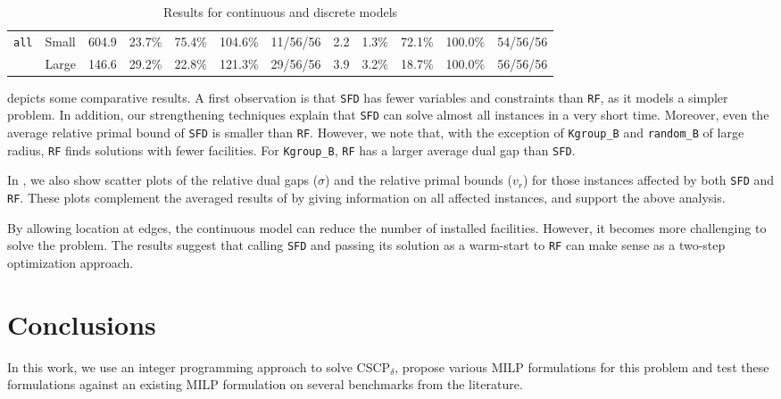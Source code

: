 \documentclass[review]{elsarticle}
\newcommand{\dlt}{{\delta}}
\newcommand{\problem}{CSCP$_\dlt$}
\theoremstyle{definition}
\begin{document}
\begin{table}[htbp]
\begin{center}
\begin{tabular}{|l|l|*{5}{r}|*{5}{r}}
\multirow{2}{*}{\texttt{all}}&Small & 604.9 & 23.7\% & 75.4\% & 104.6\% & 11/56/56 & 2.2 & 1.3\% & 72.1\% & 100.0\% & \multicolumn{1}{l|}{54/56/56} \\
&Large & 146.6 & 29.2\% & 22.8\% & 121.3\% & 29/56/56 & 3.9 & 3.2\% & 18.7\% & 100.0\% & \multicolumn{1}{l|}{56/56/56} \\
\cline{1-12}
\end{tabular}
\end{center}
\caption{Results for continuous and discrete models} \label{tab.cdm}
\end{table}

 depicts some comparative results. A first observation is that \texttt{SFD} has fewer variables and constraints than  \texttt{RF}, as it models a simpler problem. In addition, our strengthening techniques explain that \texttt{SFD} can solve almost all instances in a very short time. Moreover, even the average relative primal bound of \texttt{SFD} is smaller than \texttt{RF}. However, we note that, with the exception of \texttt{Kgroup\_B} and \texttt{random\_B} of large radius, \texttt{RF} finds solutions with fewer facilities.  For \texttt{Kgroup\_B}, \texttt{RF} has a larger average dual gap than \texttt{SFD}.

In , we  also show scatter plots of the relative dual gaps ($\sigma$) and the relative primal bounds ($v_r$) for those instances affected by both \texttt{SFD} and \texttt{RF}. These plots complement the averaged results of  by giving information on all affected instances, and support the above analysis.

By allowing location at edges, the continuous model can reduce the number of installed facilities. However, it becomes more challenging to solve the problem. The results suggest that calling \texttt{SFD} and passing its solution as a warm-start to \texttt{RF} can make sense as a two-step optimization approach.


\section{Conclusions}\label{sec:conclu}
In this work, we use an integer programming approach to solve \problem,  propose various MILP formulations for this problem and test these formulations against an existing MILP formulation on several benchmarks from the literature.
\end{document}
